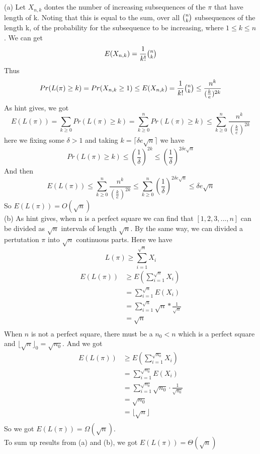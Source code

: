 \documentclass{article}
\begin{document}
	\section{}
	(a) Let $X_{n,k}$ dontes the number of increasing subsequences of the $\pi$ that have length of k. Noting that this is equal to the sum, over all $\tbinom{n}{k}$ subsequences of the length k, of the probability for the subsequence to be increasing, where $1 \leq k \leq n$. We can get
	$$E(X_{n,k})=\frac{1}{k!}\tbinom{n}{k}$$
	Thus $$Pr(L(\pi)\geq k)=Pr(X_{n,k}\geq1)\leq E(X_{n,k})=\frac{1}{k!}\tbinom{n}{k}\leq\frac{n^k}{(\frac{k}{e})^{2k}}$$
	As hint gives, we got
	$$E(L(\pi))=\sum_{k\geq0}{Pr(L(\pi)\geq k)}=\sum_{k\geq0}^{n}{Pr(L(\pi)\geq k)}\leq\sum_{k\geq0}^{n}\frac{n^k}{(\frac{k}{e})^{2k}}$$
	here we fixing some $\delta > 1$ and taking $k=\lceil{\delta e\sqrt{n}}\rceil$
	we have 
	$$Pr(L(\pi)\geq k)\leq(\frac{1}{\delta})^{2k}\leq(\frac{1}{\delta})^{2\delta e \sqrt{n}}$$
	And then
	$$E(L(\pi))\leq\sum_{k\geq0}^{n}\frac{n^k}{(\frac{k}{e})^{2k}} \leq \sum_{k\geq0}^{n}(\frac{1}{\delta})^{2\delta e \sqrt{n}} \leq \delta e \sqrt{n}$$
	So $E(L(\pi))=O(\sqrt{n})$\\
	(b) As hint gives, when n is a perfect square we can find that $[1,2,3,...,n]$ can be divided as $\sqrt{n}$ intervals of length $\sqrt{n}$. By the same way, we can divided a pertutation $\pi$ into $\sqrt{n}$ continuous parts. Here we have
	$$L(\pi) \geq \sum_{i=1}^{\sqrt{n}}{X_i}$$
	\begin{equation}
	\begin{aligned}
		E(L(\pi)) &\geq E(\sum_{i=1}^{\sqrt{n}}{X_i}) \\ 
		&= \sum_{i=1}^{\sqrt{n}}{E(X_i)} \\
		&= \sum_{i=1}^{\sqrt{n}}{\sqrt{n} * \frac{1}{\sqrt{n}}} \\
		&= \sqrt{n} \\
	\end{aligned}
	\end{equation}
	When $n$ is not a perfect square, there must be a $n_0<n$ which is a perfect square and $\lfloor \sqrt{n} \rfloor_0 = \sqrt{n_0}$.
	And we got
	\begin{equation}
	\begin{aligned}
		E(L(\pi)) &\geq E(\sum_{i=1}^{\sqrt{n_0}}{X_i}) \\ 
		&= \sum_{i=1}^{\sqrt{n_0}}{E(X_i)} \\
		&= \sum_{i=1}^{\sqrt{n_0}}{\sqrt{n_0} \cdot \frac{1}{\sqrt{n_0}}} \\
		&= \sqrt{n_0} \\
		&= \lfloor \sqrt{n} \rfloor \\
	\end{aligned}
	\end{equation}
	So we got $E(L(\pi))=\Omega(\sqrt{n})$. \\

	To sum up results from (a) and (b), we got $E(L(\pi))=\Theta(\sqrt{n})$
\end{document}
